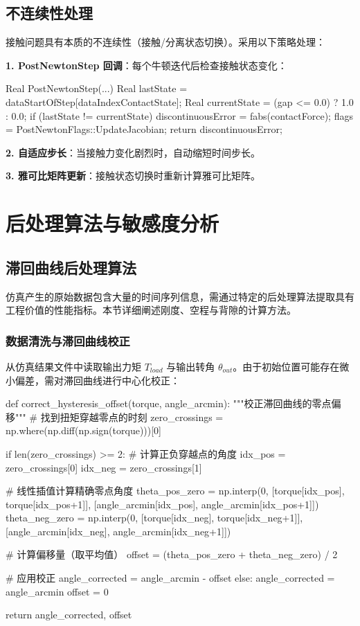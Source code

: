 \documentclass[12pt]{ctexart}
\begin{document}
\subsection{不连续性处理}

接触问题具有本质的不连续性（接触/分离状态切换）。采用以下策略处理：

\textbf{1. PostNewtonStep 回调}：每个牛顿迭代后检查接触状态变化：
\begin{cppcode}[不连续性检测]
Real PostNewtonStep(...) {
    Real lastState = dataStartOfStep[dataIndexContactState];
    Real currentState = (gap <= 0.0) ? 1.0 : 0.0;
    if (lastState != currentState) {
        discontinuousError = fabs(contactForce);
        flags = PostNewtonFlags::UpdateJacobian;
    }
    return discontinuousError;
}
\end{cppcode}

\textbf{2. 自适应步长}：当接触力变化剧烈时，自动缩短时间步长。

\textbf{3. 雅可比矩阵更新}：接触状态切换时重新计算雅可比矩阵。



\section{后处理算法与敏感度分析}

\subsection{滞回曲线后处理算法}
仿真产生的原始数据包含大量的时间序列信息，需通过特定的后处理算法提取具有工程价值的性能指标。本节详细阐述刚度、空程与背隙的计算方法。

\subsubsection{数据清洗与滞回曲线校正}
从仿真结果文件中读取输出力矩 $T_{load}$ 与输出转角 $\theta_{out}$。由于初始位置可能存在微小偏差，需对滞回曲线进行中心化校正：

\begin{pythoncode}[滞回曲线校正算法]
def correct_hysteresis_offset(torque, angle_arcmin):
    """校正滞回曲线的零点偏移"""
    # 找到扭矩穿越零点的时刻
    zero_crossings = np.where(np.diff(np.sign(torque)))[0]

    if len(zero_crossings) >= 2:
        # 计算正负穿越点的角度
        idx_pos = zero_crossings[0]
        idx_neg = zero_crossings[1]

        # 线性插值计算精确零点角度
        theta_pos_zero = np.interp(0, [torque[idx_pos], torque[idx_pos+1]],
                                   [angle_arcmin[idx_pos], angle_arcmin[idx_pos+1]])
        theta_neg_zero = np.interp(0, [torque[idx_neg], torque[idx_neg+1]],
                                   [angle_arcmin[idx_neg], angle_arcmin[idx_neg+1]])

        # 计算偏移量（取平均值）
        offset = (theta_pos_zero + theta_neg_zero) / 2

        # 应用校正
        angle_corrected = angle_arcmin - offset
    else:
        angle_corrected = angle_arcmin
        offset = 0

    return angle_corrected, offset
\end{pythoncode}
\end{document}
